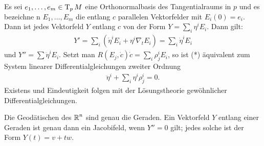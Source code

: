\begin{bew}
  Es sei $e_1, \ldots, e_m \in \operatorname{T}_pM$ eine Orthonormalbasis des
  Tangentialraums in $p$ und es bezeichne n $E_1, \ldots, E_m$ die
  entlang $c$ parallelen Vektorfelder mit $E_i(0) = e_i$. Dann ist
  jedes Vektorfeld $Y$ entlang $c$ von der Form $Y = \sum_i
  \eta^iE_i$. Dann gilt:
  \begin{align*}
    Y' = \sum_i (\dot \eta^i E_i + \eta^i\nabla_tE_i) = \sum_i \dot
    \eta^i E_i
  \end{align*}
  und $Y'' = \sum \ddot \eta^i E_i$. Setzt man $R(E_j,\dot c)\dot c =
  \sum_i\rho_j^i E_i$, so ist (*) äquivalent
  zum System linearer Differentialgleichungen zweiter Ordnung
  \begin{align*}
    \ddot \eta^i + \sum_i \eta^i\rho_j^i = 0.
  \end{align*}
  Existens und Eindeutigkeit folgen mit der Lösungstheorie
  gewöhnlicher Differentialgleichungen.
\end{bew}

\begin{bsp}
  Die Geodätischen des $\operatorname{\mathbb{R}}^n$ sind genau die Geraden.
  Ein Vektorfeld $Y$ entlang einer Geraden ist genau dann ein Jacobifeld, wenn $Y'' = 0$ gilt; jedes solche ist der Form $Y(t) = v + tw$.
  \begin{center}\end{center}
\end{bsp}

